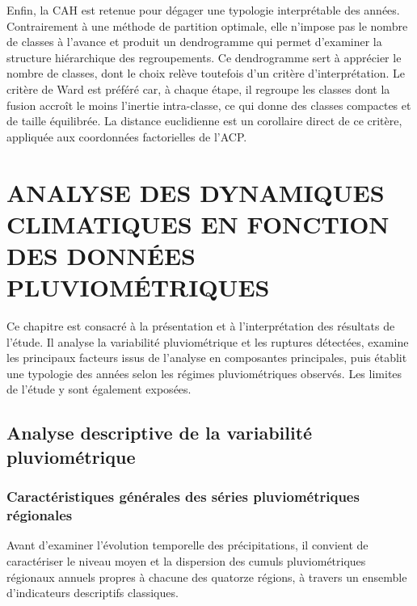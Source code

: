\documentclass[12pt,a4paper]{report}
\begin{document}
Enfin, la CAH est retenue pour dégager une typologie interprétable des années. Contrairement à une méthode de partition optimale, elle n’impose pas le nombre de classes à l’avance et produit un dendrogramme qui permet d’examiner la structure hiérarchique des regroupements. Ce dendrogramme sert à apprécier le nombre de classes, dont le choix relève toutefois d’un critère d’interprétation. Le critère de Ward est préféré car, à chaque étape, il regroupe les classes dont la fusion accroît le moins l’inertie intra-classe, ce qui donne des classes compactes et de taille équilibrée. La distance euclidienne est un corollaire direct de ce critère, appliquée aux coordonnées factorielles de l’ACP.

\chapter{ANALYSE DES DYNAMIQUES CLIMATIQUES EN FONCTION DES DONNÉES PLUVIOMÉTRIQUES}

\begin{chapterintro}
\begin{justify}
Ce chapitre est consacré à la présentation et à l'interprétation des résultats de l'étude. Il analyse la variabilité pluviométrique et les ruptures détectées, examine les principaux facteurs issus de l'analyse en composantes principales, puis établit une typologie des années selon les régimes pluviométriques observés. Les limites de l'étude y sont également exposées.
\end{justify}
\end{chapterintro}

\vspace{0.45cm}
\noindent{\color{navyblue}\rule{\textwidth}{1.1pt}}
\vspace{-0.10cm}

\section{Analyse descriptive de la variabilité pluviométrique}

\subsection{Caractéristiques générales des séries pluviométriques régionales}

Avant d'examiner l'évolution temporelle des précipitations, il convient de caractériser le niveau moyen et la dispersion des cumuls pluviométriques régionaux annuels propres à chacune des quatorze régions, à travers un ensemble d'indicateurs descriptifs classiques.
\end{document}
